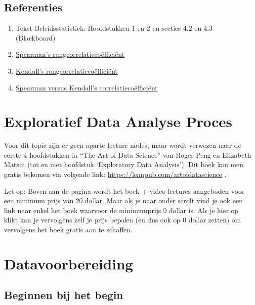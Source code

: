 \documentclass[]{memoir}
\providecommand{\tightlist}{%
  \setlength{\itemsep}{0pt}\setlength{\parskip}{0pt}}
\begin{document}
\hypertarget{referenties-2}{%
\section*{Referenties}\label{referenties-2}}

\begin{enumerate}
\def\labelenumi{\arabic{enumi}.}
\tightlist
\item
  Tekst Beleidsstatistiek: Hoofdstukken 1 en 2 en secties 4.2 en 4.3 (Blackboard)
\item
  \href{https://nl.wikipedia.org/wiki/Spearmans_rangcorrelatieco\%C3\%ABffici\%C3\%ABnt}{Spearman's rangcorrelatiecoëfficiënt}
\item
  \href{https://nl.wikipedia.org/wiki/Kendalls_tau}{Kendall's rangcorrelatiecoëfficiënt}
\item
  \href{https://www.researchgate.net/post/Does_Spearmans_rho_have_any_advantage_over_Kendalls_tau}{Spearman versus Kendall's correlatiecoëfficiënt}
\end{enumerate}

\hypertarget{exploratief-data-analyse-proces}{%
\chapter{Exploratief Data Analyse Proces}\label{exploratief-data-analyse-proces}}

Voor dit topic zijn er geen aparte lecture nodes, maar wordt verwezen naar de eerste 4 hoofdstukken in ``The Art of Data Science'' van Roger Peng en Elizabeth Matsui (tot en met hoofdstuk `Exploratory Data Analysis'). Dit boek kan men gratis bekomen via volgende link: \url{https://leanpub.com/artofdatascience} .

Let op: Boven aan de pagina wordt het boek + video lectures aangeboden voor een minimum prijs van 20 dollar. Maar als je naar onder scrolt vind je ook een link naar enkel het boek waarvoor de minimumprijs 0 dollar is. Als je hier op klikt kan je vervolgens zelf je prijs bepalen (en dus ook op 0 dollar zetten) om vervolgens het boek gratis aan te schaffen.

\hypertarget{datavoorbereiding}{%
\chapter{Datavoorbereiding}\label{datavoorbereiding}}

\hypertarget{beginnen-bij-het-begin}{%
\section{Beginnen bij het begin}\label{beginnen-bij-het-begin}}
\end{document}
